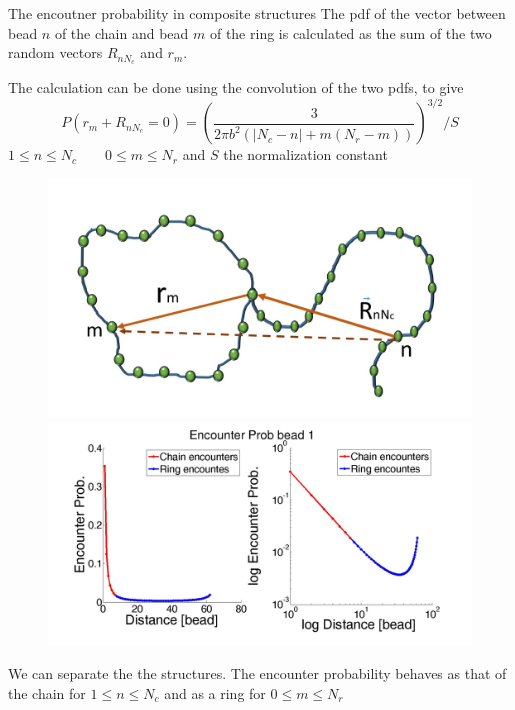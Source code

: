 \documentclass[8pt]{beamer}
\begin{document}
\begin{frame}{The encoutner probability in composite structures}
The pdf of the vector between bead $n$ of the chain and bead $m$ of the ring is calculated as the sum of the two random vectors $R_{nN_c}$ and $r_m$. 

The calculation can be done using the convolution of the two pdfs, to give 
\begin{equation*}
P(r_m+R_{nN_c}=0)=\left(\frac{3}{2\pi b^2(|N_c-n|+m(N_r-m))}\right)^{3/2}/S
\end{equation*}
$1\leq n \leq N_c \qquad 0\leq m \leq N_r$ and $S$ the normalization constant 
\begin{figure}
\includegraphics[scale=0.13]{rouseChainAndRingVectorBetweenBeads}
\includegraphics[scale=0.09]{chainRingEncounterTheoreticalProb}
\end{figure}
We can separate the the structures. 
The encounter probability behaves as that of the chain for $1\leq n \leq N_c$ and as a ring for $0\leq m \leq N_r$
\end{frame}
\end{document}

